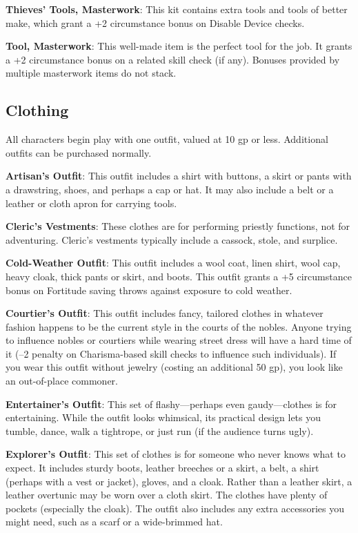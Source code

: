 \textbf{Thieves' Tools, Masterwork}: This kit contains extra tools and tools of better make, which grant a +2 circumstance bonus on Disable Device checks.
		
\textbf{Tool, Masterwork}: This well-made item is the perfect tool for the job. It grants a +2 circumstance bonus on a related skill check (if any). Bonuses provided by multiple masterwork items do not stack.
	
\subsection{Clothing}

		
All characters begin play with one outfit, valued at 10 gp or less. Additional outfits can be purchased normally.
		
\textbf{Artisan's Outfit}: This outfit includes a shirt with buttons, a skirt or pants with a drawstring, shoes, and perhaps a cap or hat. It may also include a belt or a leather or cloth apron for carrying tools.
		
\textbf{Cleric's Vestments}: These clothes are for performing priestly functions, not for adventuring. Cleric's vestments typically include a cassock, stole, and surplice. 
		
\textbf{Cold-Weather Outfit}: This outfit includes a wool coat, linen shirt, wool cap, heavy cloak, thick pants or skirt, and boots. This outfit grants a +5 circumstance bonus on Fortitude saving throws against exposure to cold weather.
		
\textbf{Courtier's Outfit}: This outfit includes fancy, tailored clothes in whatever fashion happens to be the current style in the courts of the nobles. Anyone trying to influence nobles or courtiers while wearing street dress will have a hard time of it (--2 penalty on Charisma-based skill checks to influence such individuals). If you wear this outfit without jewelry (costing an additional 50 gp), you look like an out-of-place commoner.
		
\textbf{Entertainer's Outfit}: This set of flashy---perhaps even gaudy---clothes is for entertaining. While the outfit looks whimsical, its practical design lets you tumble, dance, walk a tightrope, or just run (if the audience turns ugly).
		
\textbf{Explorer's Outfit}: This set of clothes is for someone who never knows what to expect. It includes sturdy boots, leather breeches or a skirt, a belt, a shirt (perhaps with a vest or jacket), gloves, and a cloak. Rather than a leather skirt, a leather overtunic may be worn over a cloth skirt. The clothes have plenty of pockets (especially the cloak). The outfit also includes any extra accessories you might need, such as a scarf or a wide-brimmed hat.
		
